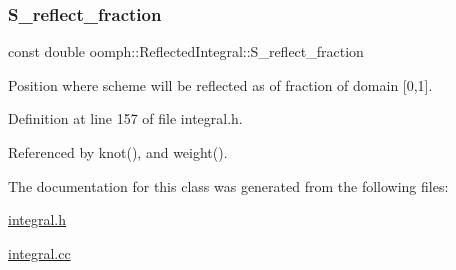 \mbox{\label{classoomph_1_1ReflectedIntegral_a6a91bd7e0119b0132273a625d6dba6d0}} 
\subsubsection{\texorpdfstring{S\+\_\+reflect\+\_\+fraction}{S\_reflect\_fraction}}
{\footnotesize\ttfamily const double oomph\+::\+Reflected\+Integral\+::\+S\+\_\+reflect\+\_\+fraction\hspace{0.3cm}{\ttfamily [private]}}



Position where scheme will be reflected as of fraction of domain \mbox{[}0,1\mbox{]}. 



Definition at line 157 of file integral.\+h.



Referenced by knot(), and weight().



The documentation for this class was generated from the following files\+:\begin{DoxyCompactItemize}
\item 
\hyperlink{integral_8h}{integral.\+h}\item 
\hyperlink{integral_8cc}{integral.\+cc}\end{DoxyCompactItemize}
